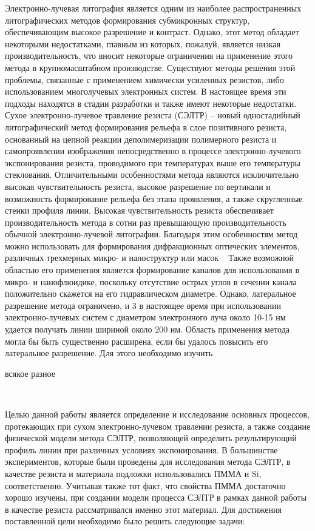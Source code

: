 {\actuality} 
Электронно-лучевая литография является одним из наиболее распространенных литографических методов формирования субмикронных структур, обеспечивающим высокое разрешение и контраст. Однако, этот метод обладает некоторыми недостатками, главным из которых, пожалуй, является низкая производительность, что вносит некоторые ограничения на применение этого метода в крупномасштабном производстве. Существуют методы решения этой проблемы, связанные с применением химически усиленных резистов, либо использованием многолучевых электронных систем. В настоящее время эти подходы находятся в стадии разработки и также имеют некоторые недостатки. Сухое электронно-лучевое травление резиста (СЭЛТР) – новый одностадийный литографический метод формирования рельефа в слое позитивного резиста, основанный на цепной реакции деполимеризации полимерного резиста и самопроявлении изображения непосредственно в процессе электронно-лучевого экспонирования резиста, проводимого при температурах выше его температуры стеклования. Отличительными особенностями метода являются исключительно высокая чувствительность резиста, высокое разрешение по вертикали и возможность формирование рельефа без этапа проявления, а также скругленные стенки профиля линии. Высокая чувствительность резиста обеспечивает производительность метода в сотни раз превышающую производительность обычной электронно-лучевой литографии. Благодаря этим особенностям метод можно использовать для формирования дифракционных оптических элементов, различных трехмерных микро- и наноструктур или масок ~\cite{Sidorov2018a} Также возможной областью его применения является формирование каналов для использования в микро- и нанофлюидике, поскольку отсутствие острых углов в сечении канала положительно скажется на его гидравлическом диаметре. Однако, латеральное разрешение метода ограничено, и 3 в настоящее время при использовании электронно-лучевых систем с диаметром электронного луча около 10-15 нм удается получать линии шириной около 200 нм. Область применения метода могла бы быть существенно расширена, если бы удалось повысить его латеральное разрешение. Для этого необходимо изучить 

всякое разное

{\previouswork}

\aimsandtasks\ 


Целью данной работы является определение и исследование основных процессов, протекающих при сухом электронно-лучевом травлении резиста, а также создание физической модели метода СЭЛТР, позволяющей определить результирующий профиль линии при различных условиях экспонирования. В большинстве экспериментов, которые были проведены для исследования метода СЭЛТР, в качестве резиста и материала подложки использовались ПММА и Si, соответственно. Учитывая также тот факт, что свойства ПММА достаточно хорошо изучены, при создании модели процесса СЭЛТР в рамках данной работы в качестве резиста рассматривался именно этот материал. Для достижения поставленной цели необходимо было решить следующие задачи:


